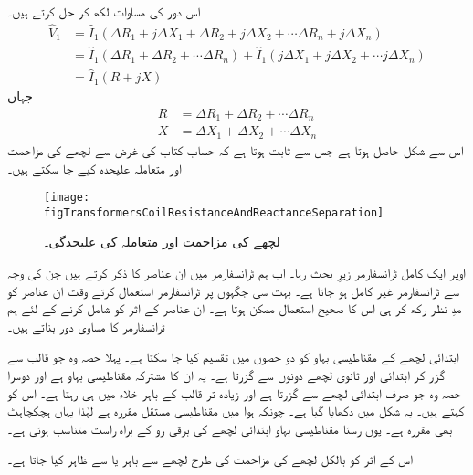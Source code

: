 اس دور کی مساوات لکھ کر حل کرتے ہیں۔
\begin{align*}
\hat{V}_1&=\hat{I}_1 \left(\Delta R_1 + j \Delta X_1 +\Delta R_2 + j \Delta X_2 + \cdots \Delta R_n + j \Delta X_n   \right)\\
&=\hat{I}_1 \left(\Delta R_1 +\Delta R_2 +\cdots \Delta R_n   \right)+\hat{I}_1 \left(j \Delta X_1 + j \Delta X_2+\cdots   j \Delta X_n   \right)\\
&=\hat{I}_1 \left( R +j X \right)
\end{align*}
جہاں
\begin{align*}
R&=\Delta R_1 +\Delta R_2 +\cdots \Delta R_n\\
X&=\Delta X_1 + \Delta X_2 +\cdots   \Delta X_n
\end{align*}
اس سے  شکل   حاصل ہوتا ہے  جس سے  ثابت ہوتا ہے کہ حساب کتاب کی غرض سے لچھے کی مزاحمت اور متعاملہ علیحدہ کیے جا سکتے ہیں۔
\begin{figure}
\centering
\texttt{[image: figTransformersCoilResistanceAndReactanceSeparation]}
\caption{لچھے کی مزاحمت اور متعاملہ کی علیحدگی۔}
\label{شکل_ٹرانسفارمر_لچھے_کی_مزاحمت_اور_متعاملہ_کی_علیحدگی}
\end{figure}
%
اوپر ایک کامل ٹرانسفارمر زیرِ بحث رہا۔ اب ہم ٹرانسفارمر میں ان عناصر کا ذکر کرتے ہیں جن کی وجہ سے ٹرانسفارمر غیر کامل ہو جاتا ہے۔ بہت سی جگہوں پر ٹرانسفارمر استعمال کرتے وقت ان عناصر کو مدِ نظر رکھ کر ہی اس کا صحیح استعمال ممکن ہوتا ہے۔ ان عناصر کے اثر کو شامل کرنے کے لئے ہم  ٹرانسفارمر کا مساوی دور بناتے ہیں۔

ابتدائی لچھے کے مقناطیسی بہاو کو دو حصوں میں تقسیم کیا جا سکتا ہے۔ پہلا حصہ وہ جو قالب سے گزر کر ابتدائی اور ثانوی لچھے دونوں سے گزرتا ہے۔ یہ ان کا مشترکہ مقناطیسی بہاو ہے اور دوسرا حصہ وہ جو صرف ابتدائی لچھے سے گزرتا ہے اور زیادہ تر قالب کے باہر خلاء میں ہی رہتا ہے۔  اس کو    کہتے ہیں۔ یہ شکل میں دکھایا گیا ہے۔ چونکہ ہوا میں مقناطیسی مستقل  مقررہ ہے لہٰذا یہاں ہچکچاہٹ بھی مقررہ ہے۔  یوں رستا مقناطیسی بہاو ابتدائی لچھے کی برقی رو کے  براہ راست متناسب ہوتی ہے۔

 اس کے اثر کو بالکل لچھے کی مزاحمت کی طرح لچھے سے باہر   یا    سے ظاہر کیا جاتا ہے۔

